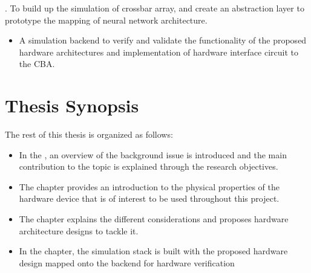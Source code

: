 . To build up the simulation of crossbar array, and create an abstraction layer to prototype the mapping of neural network architecture.
  \begin{itemize}
    \item A simulation backend to verify and validate the functionality of the proposed hardware architectures and implementation of hardware interface circuit to the \ac{CBA}.
  \end{itemize}

\section{Thesis Synopsis}

\noindent
The rest of this thesis is organized as follows:

\begin{itemize}
  \item
  In the , an overview of the background issue is introduced and the main contribution to the topic is explained through the research objectives.
  \item
  The  chapter provides an introduction to the physical properties of the hardware device that is of interest to be used throughout this project.
  \item
  The  chapter explains the different considerations and proposes hardware architecture designs to tackle it.
  \item
  In the  chapter, the simulation stack is built with the proposed hardware design mapped onto the backend for hardware verification
\end{itemize}